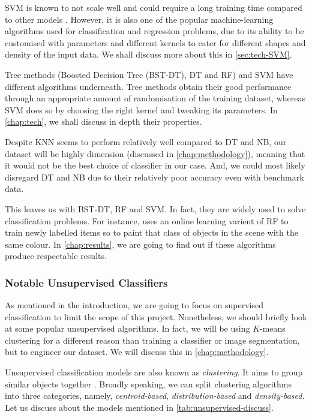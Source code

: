 SVM is known to not scale well and could require a long training time compared to other models \cite{compare-supervised}. However, it is also one of the popular machine-learning algorithms used for classification and regression problems, due to its ability to be customised with parameters and different kernels to cater for different shapes and density of the input data. We shall discuss more about this in \autoref{sec:tech-SVM}.

Tree methods (Boosted Decision Tree (BST-DT), DT and RF) and SVM have different algorithms underneath. Tree methods obtain their good performance through an appropriate amount of randomisation of the training dataset, whereas SVM does so by choosing the right kernel and tweaking its parameters. In \autoref{chap:tech}, we shall discuss in depth their properties.

Despite KNN seems to perform relatively well compared to DT and NB, our dataset will be highly dimension (discussed in \autoref{chap:methodology}), meaning that it would not be the best choice of classifier in our case. And, we could most likely disregard DT and NB due to their relatively poor accuracy even with benchmark data.

This leaves us with BST-DT, RF and SVM. In fact, they are widely used to solve classification problems. For instance, \cite{semantic-paint} uses an online learning varient of RF to train newly labelled items so to paint that class of objects in the scene with the same colour. In \autoref{chap:results}, we are going to find out if these algorithms produce respectable results.


\subsubsection{Notable Unsupervised Classifiers}
As mentioned in the introduction, we are going to focus on supervised classification to limit the scope of this project. Nonetheless, we should briefly look at some popular unsupervised algorithms. In fact, we will be using $K$-means clustering for a different reason than training a classifier or image segmentation, but to engineer our dataset. We will discuss this in \autoref{chap:methodology}.

Unsupervised classification models are also known as \textit{clustering}. It aims to group similar objects together \cite{mur-book}. Broadly speaking, we can split clustering algorithms into three categories, namely, \textit{centroid-based}, \textit{distribution-based} and \textit{density-based}. Let us discuss about the models mentioned in \autoref{tab:unsupervised-discuss}.

